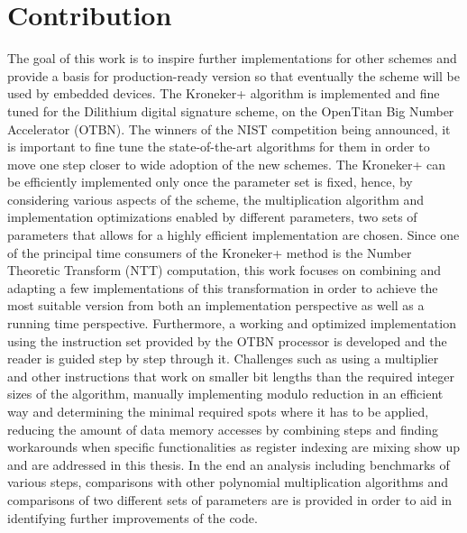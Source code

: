 \break


\section{Contribution}

The goal of this work is to inspire further implementations for other schemes and provide a basis for production-ready version so that eventually the scheme will be used by embedded devices. The Kroneker+ algorithm is implemented and fine tuned for the Dilithium digital signature scheme, on the OpenTitan Big Number Accelerator (OTBN). The winners of the NIST competition being announced, it is important to fine tune the state-of-the-art algorithms for them in order to move one step closer to wide adoption of the new schemes. The Kroneker+ can be efficiently implemented only once the parameter set is fixed, hence, by considering various aspects of the scheme, the multiplication algorithm and implementation optimizations enabled by different parameters, two sets of parameters that allows for a highly efficient implementation are chosen. Since one of the principal time consumers of the Kroneker+ method is the Number Theoretic Transform (NTT) computation, this work focuses on combining and adapting a few implementations of this transformation in order to achieve the most suitable version from both an implementation perspective as well as a running time perspective. Furthermore, a working and optimized implementation using the instruction set provided by the OTBN processor is developed and the reader is guided step by step through it. Challenges such as using a multiplier and other instructions that work on smaller bit lengths than the required integer sizes of the algorithm, manually implementing modulo reduction in an efficient way and determining the minimal required spots where it has to be applied, reducing the amount of data memory accesses by combining steps and finding workarounds when specific functionalities as register indexing are mixing show up and are addressed in this thesis. In the end an analysis including benchmarks of various steps, comparisons with other polynomial multiplication algorithms and comparisons of two different sets of parameters are is provided in order to aid in identifying further improvements of the code.
